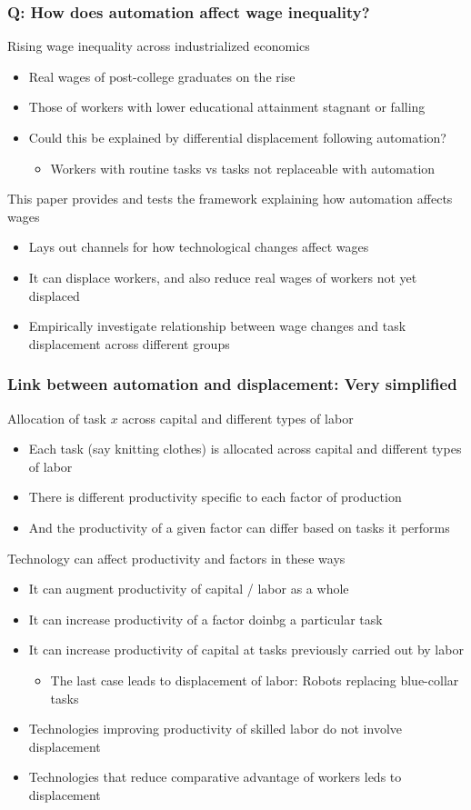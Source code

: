 \documentclass[aspectratio=169]{beamer}
\begin{document}
\begin{frame}
\frametitle{Q: How does automation affect wage inequality?} 
Rising wage inequality across industrialized economics 
\begin{itemize}\setlength\itemsep{3pt}
\item Real wages of post-college graduates on the rise
\item Those of workers with lower educational attainment stagnant or falling
\item Could this be explained by differential displacement following automation?
\begin{itemize}
\item Workers with routine tasks vs tasks not replaceable with automation
\end{itemize}
\end{itemize}\medskip
This paper provides and tests the framework explaining how automation affects wages
\begin{itemize}\setlength\itemsep{3pt}
\item Lays out channels for how technological changes affect wages
\item It can displace workers, and also reduce real wages of workers not yet displaced
\item Empirically investigate relationship between wage changes and task displacement across different groups
\end{itemize}
\end{frame}

\begin{frame}
\frametitle{Link between automation and displacement: Very simplified} 
Allocation of task $x$ across capital and different types of labor
\begin{itemize}\setlength\itemsep{3pt}
\item Each task (say knitting clothes) is allocated across capital and different types of labor
\item There is different productivity specific to each factor of production
\item And the productivity of a given factor can differ based on tasks it performs
\end{itemize}\medskip
Technology can affect productivity and factors in these ways
\begin{itemize}\setlength\itemsep{3pt}
\item It can augment productivity of capital / labor as a whole
\item It can increase productivity of a factor doinbg a particular task
\item It can increase productivity of capital at tasks previously carried out by labor
\begin{itemize}
\item The last case leads to displacement of labor: Robots replacing blue-collar tasks
\end{itemize}
\item Technologies improving productivity of skilled labor do not involve displacement
\item Technologies that reduce comparative advantage of workers leds to displacement
\end{itemize}\medskip
\end{frame}
\end{document}
